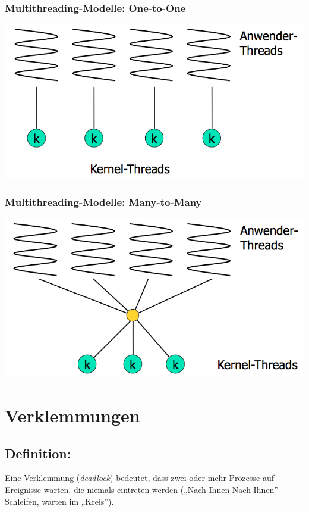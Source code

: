 \documentclass[11pt]{article}
\begin{document}
\subsubsection*{Multithreading-Modelle: One-to-One}
\label{sec:org7568108}
\begin{center}
\includegraphics[width=.9\linewidth]{./Abbildungen/onetoone.png}
\end{center}

\subsubsection*{Multithreading-Modelle: Many-to-Many}
\label{sec:org6b8531d}
\begin{center}
\includegraphics[width=.9\linewidth]{./Abbildungen/manytomany.png}
\end{center}

\section*{Verklemmungen}
\label{sec:org94ff762}
\subsection*{Definition:}
\label{sec:orgeed212c}
Eine Verklemmung (\emph{deadlock}) bedeutet, dass zwei oder mehr Prozesse
auf Ereignisse warten, die niemals eintreten werden
(„Nach-Ihnen-Nach-Ihnen”-Schleifen, warten im „Kreis”).
\end{document}
